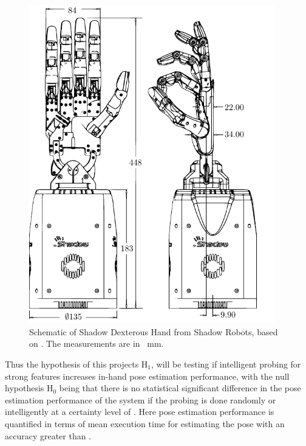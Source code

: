 	\begin{minipage}{0.45\textwidth}
	\begin{figure}[H]
		\begin{small}
			\begin{center}
				\includegraphics[width=0.95\textwidth]{chapters/introduction/fig/shadow-dex-hand-vector.pdf}
			\end{center}
			\caption{Schematic of Shadow Dexterous Hand from Shadow Robots, based on \cite{shadow-dex-hand-schematic}. The measurements are in \SI{}{\milli\metre}.}
			\label{fig:shadow-dex-hand-schematic}
		\end{small}
	\end{figure}
\end{minipage}

Thus the hypothesis of this projects $\text{H}_1$, will be testing if intelligent probing for strong features increases in-hand pose estimation performance, with the null hypothesis $\text{H}_0$ being that there is no statistical significant difference in the pose estimation performance of the system if the probing is done randomly or intelligently at a certainty level of . Here pose estimation performance is quantified in terms of mean execution time for estimating the pose with an accuracy greater than . \medskip

